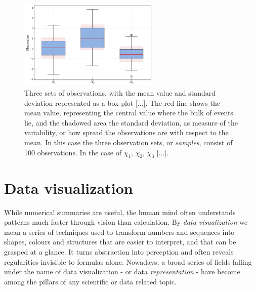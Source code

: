 \documentclass{book}
\begin{document}
\begin{figure}[ht]
    \centering
    \includegraphics[width=0.6\textwidth]{figures/chapter1/mean_std_box.png}
    \caption{Three sets of observations, with the mean value and standard deviation represented as a box plot [...]. The red line shows the mean value, representing the central value where the bulk of events lie, and the shadowed area the standard deviation, as measure of the variability, or how spread the observations are with respect to the mean. In this case the three observation sets, or \textit{samples}, consist of 100 observations. In the case of $\chi_1$, $\chi_2$, $\chi_3$ [...].}
    \label{fig:histogram1}
\end{figure}

\section{Data visualization}

While numerical summaries are useful, the human mind often understands patterns much faster through vision than calculation. By \textit{data visualization} we mean a series of techniques used to transform numbers and sequences into shapes, colours and structures that are easier to interpret, and that can be grasped at a glance. It turns abstraction into perception and often reveals regularities invisible to formulas alone. Nowadays, a broad series of fields falling under the name of data visualization - or data \textit{representation} - have become among the pillars of any scientific or data related topic.

\medskip
\end{document}
